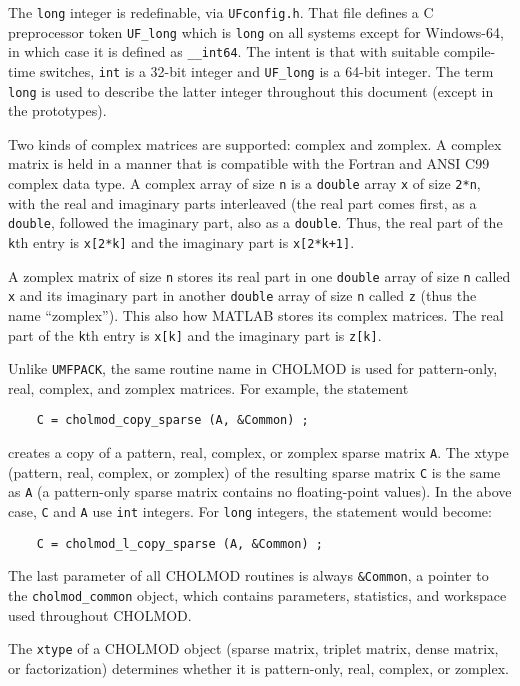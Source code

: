 \documentclass[11pt]{article}
\begin{document}
The {\tt long} integer is redefinable, via {\tt UFconfig.h}.
That file defines a C preprocessor token {\tt UF\_long} which is
{\tt long} on all systems except for Windows-64, in which case it is
defined as {\tt \_\_int64}.  The intent is that with suitable compile-time
switches, {\tt int} is a 32-bit integer and {\tt UF\_long} is a 64-bit
integer.  The term {\tt long} is used to describe the latter
integer throughout this document (except in the prototypes).

Two kinds of complex matrices are supported: complex and zomplex.
A complex matrix is held in a manner that is compatible with the
Fortran and ANSI C99 complex data type.  A complex array of size {\tt n}
is a {\tt double} array {\tt x} of size {\tt 2*n}, with the real and imaginary
parts interleaved (the real part comes first, as a {\tt double}, followed the
imaginary part, also as a {\tt double}.  Thus, the real part of the {\tt k}th
entry is {\tt x[2*k]} and the imaginary part is {\tt x[2*k+1]}.

A zomplex matrix of size {\tt n} stores its real part in one
{\tt double} array of size {\tt n} called {\tt x} and its imaginary part
in another {\tt double} array of size {\tt n} called {\tt z} (thus the
name ``zomplex'').  This also how MATLAB stores its complex matrices.
The real part of the {\tt k}th entry is {\tt x[k]} and the imaginary part is
{\tt z[k]}.

Unlike {\tt UMFPACK}, the same routine name in CHOLMOD is used for pattern-only,
real, complex, and zomplex matrices.  For example, the statement
\begin{verbatim}
    C = cholmod_copy_sparse (A, &Common) ;
\end{verbatim}
creates a copy of a pattern, real, complex, or zomplex sparse matrix {\tt A}.
The xtype (pattern, real, complex, or zomplex) of the resulting sparse matrix {\tt C}
is the same as {\tt A} (a pattern-only sparse matrix contains no floating-point
values).  In the above case, {\tt C} and {\tt A} use {\tt int} integers.
For {\tt long} integers, the statement would become:
\begin{verbatim}
    C = cholmod_l_copy_sparse (A, &Common) ;
\end{verbatim}
The last parameter of all CHOLMOD routines is always {\tt \&Common},
a pointer to the
{\tt cholmod\_common} object, which contains parameters, statistics,
and workspace used throughout CHOLMOD.

The {\tt xtype} of a CHOLMOD object (sparse matrix, triplet matrix, dense
matrix, or factorization) determines whether it is pattern-only,
real, complex, or zomplex.
\end{document}
